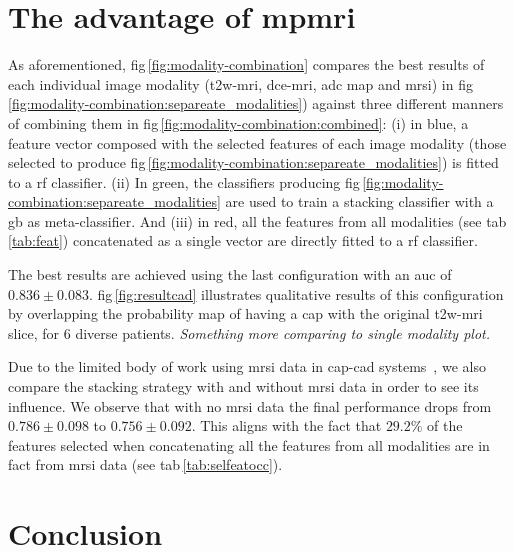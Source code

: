 \documentclass[a4paper,num-refs]{wiley-article}
\begin{document}
\section{The advantage of mpmri}%
\label{sec:experiments:mpmri-comparison}

As aforementioned, \ac{fig}\,\ref{fig:modality-combination} compares the best
results of each individual image modality (\ac{t2w}-\ac{mri}, \ac{dce}-\ac{mri},
\ac{adc} map and \ac{mrsi}) in 
\ac{fig}\,\ref{fig:modality-combination:separeate_modalities}) against three
different manners of combining them in \ac{fig}\,\ref{fig:modality-combination:combined}:
(i) in blue, a feature vector composed with the selected features of each image
modality (those selected to produce
\Ac{fig}\,\ref{fig:modality-combination:separeate_modalities}) is fitted to a
\ac{rf} classifier.
(ii) In green, the classifiers producing
\Ac{fig}\,\ref{fig:modality-combination:separeate_modalities} are used to train
a stacking classifier with a \ac{gb} as meta-classifier.
And (iii) in red, all the features from all modalities (see
\Ac{tab}\,\ref{tab:feat}) concatenated as a single vector are directly fitted to
a \ac{rf} classifier.

The best results are achieved using the last configuration with an \ac{auc} of
$0.836 \pm 0.083$.
\Acl{fig}\,\ref{fig:resultcad} illustrates qualitative results of this
configuration by overlapping the probability map of having a \ac{cap} with the
original \ac{t2w}-\ac{mri} slice, for 6 diverse patients.
\emph{Something more comparing to single modality plot.}

Due to the limited body of work using \ac{mrsi} data in \ac{cap}-\ac{cad}
systems~\cite{lemaitre2015computer}, we also compare the stacking strategy with
and without \ac{mrsi} data in order to see its influence. We observe that with
no \ac{mrsi} data the final performance drops from 
$0.786 \pm 0.098$ to $0.756 \pm 0.092$.
This aligns with the fact that $29.2\%$ of the features selected when
concatenating all the features from all modalities are in fact from \ac{mrsi}
data (see \Ac{tab}\,\ref{tab:selfeatocc}).


\section{Conclusion}
\label{sec:conclusion}

\end{document}
